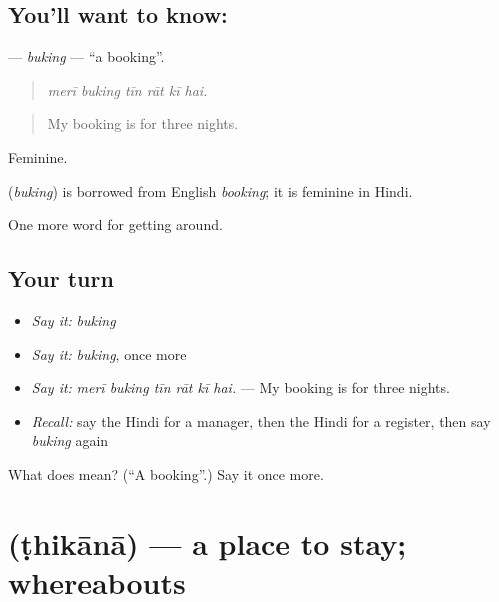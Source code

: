 \subsection*{You'll want to know: }
\textbf{} — \emph{buking} — \textquotedblleft{}a booking\textquotedblright{}.

\begin{quote}
     
\end{quote}

\begin{quote}
\emph{merī buking tīn rāt kī hai.}
\end{quote}

\begin{quote}
My booking is for three nights.
\end{quote}

Feminine.

\begin{cousinweb}
\textbf{} (\emph{buking}) is borrowed from English \emph{booking}; it is feminine in Hindi.
\end{cousinweb}

\begin{grammarlens}[title={What you've built}]
One more word for getting around.
\end{grammarlens}

\subsection*{Your turn}
\begin{itemize}
\raggedright
  \item \emph{Say it:} \emph{buking}
  \item \emph{Say it:} \emph{buking}, once more
  \item \emph{Say it:} \emph{merī buking tīn rāt kī hai.} — My booking is for three nights.
  \item \emph{Recall:} say the Hindi for a manager, then the Hindi for a register, then say \emph{buking} again
\end{itemize}

\begin{tcolorbox}[breakable,colback=teal!4,colframe=teal!35!black,title={Before you move on}]
What does  mean? (\textquotedblleft{}A booking\textquotedblright{}.) Say it once more.
\end{tcolorbox}
\section[\texorpdfstring{\hi{ठिकाना} (ṭhikānā)}{ठिकाना (ṭhikānā)}]{ (ṭhikānā) — a place to stay; whereabouts}


